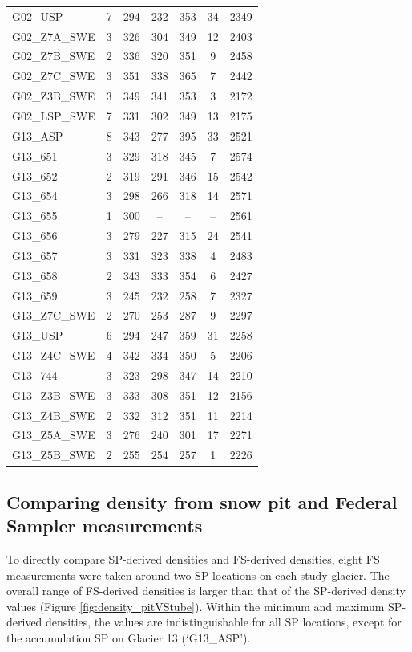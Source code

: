 \documentclass{sfuthesis}
\begin{document}
\begin{table}[]
\begin{tabular}{lcccccc}
G02\_USP & 7 & 294 & 232 & 353 & 34  & 2349\\
G02\_Z7A\_SWE & 3 & 326 & 304 & 349 & 12  & 2403\\
G02\_Z7B\_SWE & 2 & 336 & 320 & 351 & 9 & 2458 \\
G02\_Z7C\_SWE & 3 & 351 & 338 & 365 & 7 & 2442 \\
G02\_Z3B\_SWE & 3 & 349 & 341 & 353 & 3  & 2172\\
G02\_LSP\_SWE & 7 & 331 & 302 & 349 & 13 & 2175 \\ \hline
G13\_ASP & 8 & 343 & 277 & 395 & 33  & 2521\\
G13\_651 & 3 & 329 & 318 & 345 & 7  & 2574\\
G13\_652 & 2 & 319 & 291 & 346 & 15  & 2542\\
G13\_654 & 3 & 298 & 266 & 318 & 14  & 2571\\
G13\_655 & 1 & 300 &-- & -- & --  & 2561\\
G13\_656 & 3 & 279 & 227 & 315 & 24  & 2541\\
G13\_657 & 3 & 331 & 323 & 338 & 4  & 2483\\
G13\_658 & 2 & 343 & 333 & 354 & 6  & 2427\\
G13\_659 & 3 & 245 & 232 & 258 & 7 & 2327 \\
G13\_Z7C\_SWE & 2 & 270 & 253 & 287 & 9  & 2297\\
G13\_USP & 6 & 294 & 247 & 359 & 31  & 2258\\
G13\_Z4C\_SWE & 4 & 342 & 334 & 350 & 5 & 2206 \\
G13\_744 & 3 & 323 & 298 & 347 & 14 & 2210 \\
G13\_Z3B\_SWE & 3 & 333 & 308 & 351 & 12 & 2156 \\
G13\_Z4B\_SWE & 2 & 332 & 312 & 351 & 11  & 2214\\
G13\_Z5A\_SWE & 3 & 276 & 240 & 301 & 17  & 2271\\
G13\_Z5B\_SWE & 2 & 255 & 254 & 257 & 1 & 2226
\end{tabular}
\end{table}

\subsection{Comparing density from snow pit and Federal Sampler measurements}

To directly compare SP-derived densities and FS-derived densities, eight FS measurements were taken around two SP locations on each study glacier.  The overall range of FS-derived densities is larger than that of the SP-derived density values (Figure \ref{fig:density_pitVStube}). Within the minimum and maximum SP-derived densities, the values are indistinguishable for all SP locations, except for the accumulation SP on Glacier 13 (`G13\_ASP').
\end{document}
